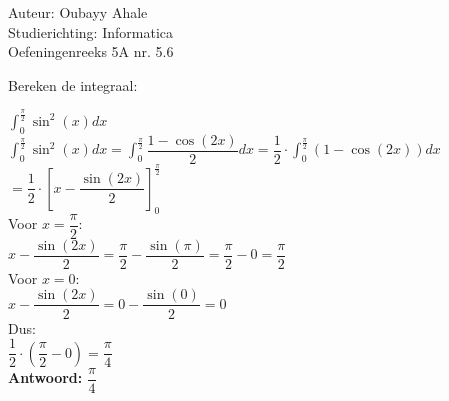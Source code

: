 \documentclass[a4paper]{article}
\newcommand{\dint}{\displaystyle\int}
\begin{document}
  
\noindent \large Auteur: Oubayy Ahale         \\
\noindent \large Studierichting: Informatica  \\
\noindent \large Oefeningenreeks 5A nr. 5.6   \\

\medskip

\normalsize

Bereken de integraal:

$\dint_{0}^{\tfrac{\pi}{2}} \sin^2(x) dx$\\

$\dint_{0}^{\tfrac{\pi}{2}} \sin^2(x) dx = \dint_{0}^{\tfrac{\pi}{2}} \dfrac{1 - \cos(2x)}{2} dx = \dfrac{1}{2} \cdot \dint_{0}^{\tfrac{\pi}{2}} \left( 1 - \cos(2x) \right) dx$\\

$= \dfrac{1}{2} \cdot \left[ x - \dfrac{\sin(2x)}{2} \right]_{0}^{\tfrac{\pi}{2}}$\\

Voor $x = \dfrac{\pi}{2}$:\\

$x - \dfrac{\sin(2x)}{2} = \dfrac{\pi}{2} - \dfrac{\sin(\pi)}{2} = \dfrac{\pi}{2} - 0 = \dfrac{\pi}{2}$\\

Voor $x = 0$:\\

$x - \dfrac{\sin(2x)}{2} = 0 - \dfrac{\sin(0)}{2} = 0$\\

Dus:\\

$\dfrac{1}{2} \cdot \left( \dfrac{\pi}{2} - 0 \right) = \dfrac{\pi}{4}$\\

\textbf{Antwoord:} $\boxed{\dfrac{\pi}{4}}$\\
\end{document}
